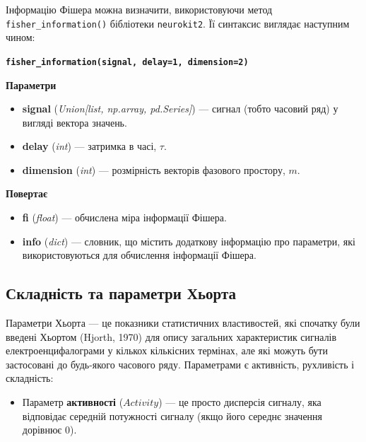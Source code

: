 \documentclass[
  letterpaper,
]{report}
\providecommand{\tightlist}{%
  \setlength{\itemsep}{0pt}\setlength{\parskip}{0pt}}\usepackage{longtable,booktabs,array}
\begin{document}
Інформацію Фішера можна визначити, використовуючи метод
\texttt{fisher\_information()} бібліотеки \texttt{neurokit2}. Її
синтаксис виглядає наступним чином:

\textbf{\texttt{fisher\_information(signal,\ delay=1,\ dimension=2)}}

\textbf{Параметри}

\begin{itemize}
\tightlist
\item
  \textbf{signal} (\emph{Union{[}list, np.array, pd.Series{]}}) ---
  сигнал (тобто часовий ряд) у вигляді вектора значень.
\item
  \textbf{delay} (\emph{int}) --- затримка в часі, \(\tau\).
\item
  \textbf{dimension} (\emph{int}) --- розмірність векторів фазового
  простору, \(m\).
\end{itemize}

\textbf{Повертає}

\begin{itemize}
\tightlist
\item
  \textbf{fi} (\emph{float}) --- обчислена міра інформації Фішера.
\item
  \textbf{info} (\emph{dict}) --- словник, що містить додаткову
  інформацію про параметри, які використовуються для обчислення
  інформації Фішера.
\end{itemize}

\hypertarget{ux441ux43aux43bux430ux434ux43dux456ux441ux442ux44c-ux442ux430-ux43fux430ux440ux430ux43cux435ux442ux440ux438-ux445ux44cux43eux440ux442ux430}{%
\subsection{Складність та параметри
Хьорта}\label{ux441ux43aux43bux430ux434ux43dux456ux441ux442ux44c-ux442ux430-ux43fux430ux440ux430ux43cux435ux442ux440ux438-ux445ux44cux43eux440ux442ux430}}

Параметри Хьорта --- це показники статистичних властивостей, які
спочатку були введені Хьортом (Hjorth, 1970) для опису загальних
характеристик сигналів електроенцифалограми у кількох кількісних
термінах, але які можуть бути застосовані до будь-якого часового ряду.
Параметрами є активність, рухливість і складність:

\begin{itemize}
\tightlist
\item
  Параметр \textbf{активності} (\(Activity\)) --- це просто дисперсія
  сигналу, яка відповідає середній потужності сигналу (якщо його середнє
  значення дорівнює 0).
\end{itemize}
\end{document}
